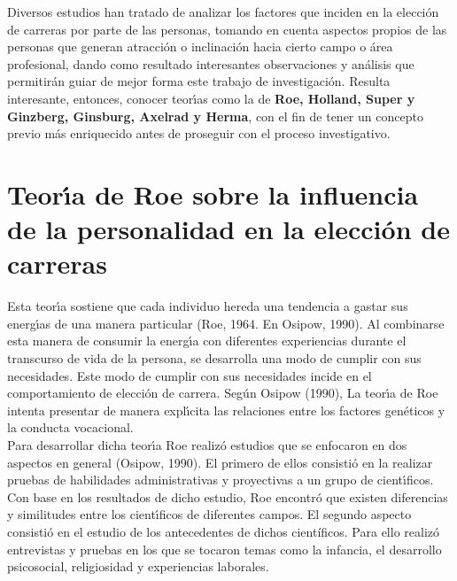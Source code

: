%

Diversos estudios han tratado de analizar los factores que inciden en la elecci\'{o}n de carreras por parte de las personas, tomando en cuenta aspectos propios de las personas que generan atracci\'{o}n o inclinaci\'{o}n hacia cierto campo o \'{a}rea profesional, dando como resultado interesantes observaciones y an\'{a}lisis que permitir\'{a}n guiar de mejor forma este trabajo de investigaci\'{o}n. Resulta interesante, entonces, conocer teor\'{\i}as como la de \textbf{Roe, Holland, Super y Ginzberg, Ginsburg, Axelrad y Herma}, con el fin de tener un concepto previo m\'{a}s enriquecido antes de proseguir con el proceso investigativo. \\

\section{Teor\'{\i}a de Roe sobre la influencia de la personalidad en la elecci\'{o}n de carreras}
Esta teor\'{\i}a sostiene que cada individuo hereda una tendencia a gastar sus energ\'{\i}as de una manera particular (Roe, 1964. En Osipow, 1990). Al combinarse esta manera de consumir la energ\'{\i}a con diferentes experiencias durante el transcurso de vida de la persona, se desarrolla una modo de cumplir con sus necesidades. Este modo de cumplir con sus necesidades incide en el comportamiento de elecci\'{o}n de carrera. Seg\'{u}n Osipow (1990), La teor\'{\i}a de Roe intenta presentar de manera expl\'{\i}cita las relaciones entre los factores gen\'{e}ticos y la conducta vocacional.\\

Para desarrollar dicha teor\'{\i}a Roe realiz\'{o} estudios que se enfocaron en dos aspectos en general (Osipow, 1990). El primero de ellos consisti\'{o} en la realizar pruebas de habilidades administrativas y proyectivas a un grupo de cient\'{\i}ficos. Con base en los resultados de dicho estudio, Roe encontr\'{o} que existen diferencias y similitudes entre los cient\'{\i}ficos de diferentes campos. El segundo aspecto consisti\'{o} en el estudio de los antecedentes de dichos científicos. Para ello realiz\'{o} entrevistas y pruebas en los que se tocaron temas como la infancia, el desarrollo psicosocial, religiosidad y experiencias laborales.\\

